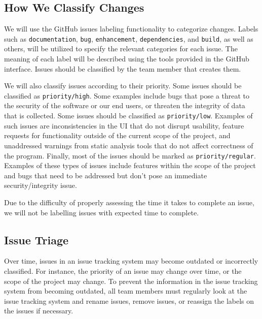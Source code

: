 \documentclass[fullpage]{article}
\begin{document}
\subsection{How We Classify Changes}
We will use the GitHub issues labeling functionality to categorize changes. Labels such as \verb|documentation|, \verb|bug|, \verb|enhancement|, \verb|dependencies|, and \verb|build|, as well as others, will be utilized to specify the relevant categories for each issue. The meaning of each label will be described using the tools provided in the GitHub interface. Issues should be classified by the team member that creates them.

We will also classify issues according to their priority. Some issues should be classified as \verb|priority/high|. Some examples include bugs that pose a threat to the security of the software or our end users, or threaten the integrity of data that is collected. Some issues should be classified as \verb|priority/low|. Examples of such issues are inconsistencies in the UI that do not disrupt usability, feature requests for functionality outside of the current scope of the project, and unaddressed warnings from static analysis tools that do not affect correctness of the program. Finally, most of the issues should be marked as \verb|priority/regular|. Examples of these types of issues include features within the scope of the project and bugs that need to be addressed but don’t pose an immediate security/integrity issue.

Due to the difficulty of properly assessing the time it takes to complete an issue, we will not be labelling issues with expected time to complete.

\subsection{Issue Triage}
Over time, issues in an issue tracking system may become outdated or incorrectly classified. For instance, the priority of an issue may change over time, or the scope of the project may change. To prevent the information in the issue tracking system from becoming outdated, all team members must regularly look at the issue tracking system and rename issues, remove issues, or reassign the labels on the issues if necessary.
\end{document}
